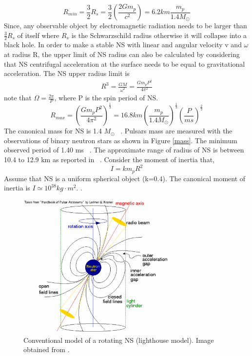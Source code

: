\documentclass[thesis_msc.tex]{subfiles}
\begin{document}
        \begin{equation} \label{rmin}
    R_{min}=\frac{3}{2} R_s = \frac{3}{2}(\frac{2Gm_p}{c^2})=6.2km \frac{m_p}{1.4M_\odot}
    \end{equation}
Since, any observable object by electromagnetic radiation needs to be larger than $\frac{3}{2} R_s$ of itself where $R_s$ is the Schwarzschild radius otherwise it will collapse into a black hole. %
In order to make a stable NS with linear and angular velocity v and $\omega$ at radius R, the upper limit of NS radius can also be calculated by considering that NS centrifugal acceleration at the surface needs to be equal to gravitational acceleration. The NS upper radius limit is
    \begin{eqnarray}
    R^3=\frac{GM}{\omega^2}=\frac{Gm_pP^2}{4\pi^2}
    \end{eqnarray}
    note that $\Omega=\frac{2\pi}{P}$, where P is the spin period of NS.
    \begin{equation} \label{rmax}
    R_{max}=(\frac{Gm_pP^2}{4\pi^2})^{\frac{1}{3}}=16.8km (\frac{m_p}{1.4M_\odot})^{\frac{1}{3}}(\frac{P}{ms})^{\frac{2}{3}}
    \end{equation}
    The canonical mass for NS is 1.4 $M_\odot$ %
    ~\citep{antoniadis2016millisecond}. Pulsars mass are measured with the observations of binary neutron stars as shown in Figure \ref{mass}. The minimum observed period of 1.40 ms ~\citep{hessels2006radio}. The approximate range of radius of NS is between 10.4 to 12.9 km as reported in ~\cite{ozel2016masses}. Consider the moment of inertia that,   
   \begin{equation} \label{I}
   I=km_pR^2
   \end{equation}
Assume that NS is a uniform spherical object (k=0.4). The canonical moment of inertia is $I\simeq 10^{38} kg\cdot m^2$. . 
    \begin{center}
\begin{figure}[h] \centering
\includegraphics[width=0.7\textwidth]{figures/lhmodel.png}
\caption{Conventional model of a rotating NS (lighthouse model). Image obtained from \citep{handbook}.  }
\label{lhmodel}
\end{figure}
\end{center}   
\end{document}

